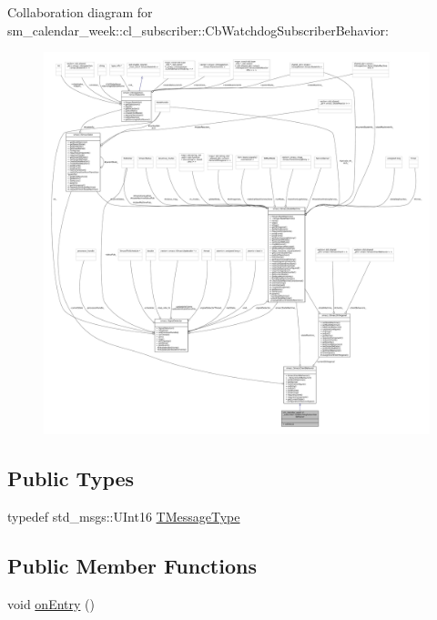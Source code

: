Collaboration diagram for sm\+\_\+calendar\+\_\+week\+:\+:cl\+\_\+subscriber\+:\+:Cb\+Watchdog\+Subscriber\+Behavior\+:
\nopagebreak
\begin{figure}[H]
\begin{center}
\leavevmode
\includegraphics[width=350pt]{classsm__calendar__week_1_1cl__subscriber_1_1CbWatchdogSubscriberBehavior__coll__graph}
\end{center}
\end{figure}
\subsection*{Public Types}
\begin{DoxyCompactItemize}
\item 
typedef std\+\_\+msgs\+::\+U\+Int16 \hyperlink{classsm__calendar__week_1_1cl__subscriber_1_1CbWatchdogSubscriberBehavior_acac137f7ddee9f2efad218255ec48da6}{T\+Message\+Type}
\end{DoxyCompactItemize}
\subsection*{Public Member Functions}
\begin{DoxyCompactItemize}
\item 
void \hyperlink{classsm__calendar__week_1_1cl__subscriber_1_1CbWatchdogSubscriberBehavior_a291895411a45ffe349a6117d51e11212}{on\+Entry} ()
\end{DoxyCompactItemize}


